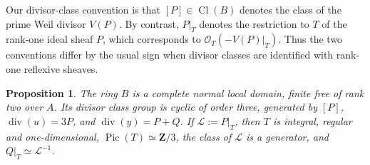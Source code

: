 \documentclass[10pt]{amsart}
\DeclareMathOperator{\Pic}{Pic}
\DeclareMathOperator{\Cl}{Cl}
\newtheorem{proposition}[proposition]{Proposition}
\theoremstyle{remark}
\begin{document}
Our divisor-class convention is that \([P]\in\Cl(B)\) denotes the class of
the prime Weil divisor \(V(P)\). By contrast, \(P|_T\) denotes the
restriction to \(T\) of the rank-one ideal sheaf \(P\), which corresponds
to \(\mathcal O_T(-V(P)|_T)\). Thus the two conventions differ by the
usual sign when divisor classes are identified with rank-one reflexive
sheaves.


\begin{proposition}\label{prop:geometry}
The ring $B$ is a complete normal local domain, finite free of rank two
over $A$.  
Its divisor class group is cyclic of order three, generated by
$[P]$, \( \operatorname{div}(u)=3P\), and \( \operatorname{div}(y)=P+Q\).
If \(\mathcal L:=P|_T\), then \(T\) is integral, regular
and one-dimensional, $\Pic(T)\simeq\mathbf Z/3$, the class of $\mathcal L$
is a generator, and $Q|_T\simeq\mathcal L^{-1}$.

\end{proposition}
\end{document}
